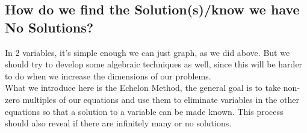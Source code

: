 \documentclass[10pt]{article}
\theoremstyle{definition}
\begin{document}
\subsection{How do we find the Solution(s)/know we have No Solutions?}

In 2 variables, it's simple enough we can just graph, as we did above.  But we should try to develop some algebraic techniques as well, since this will be harder to do when we increase the dimensions of our problems.\\


What we introduce here is the Echelon Method, the general goal is to take non-zero multiples of our equations and use them to eliminate variables in the other equations so that a solution to a variable can be made known.  This process should also reveal if there are infinitely many or no solutions.\\
\end{document}

